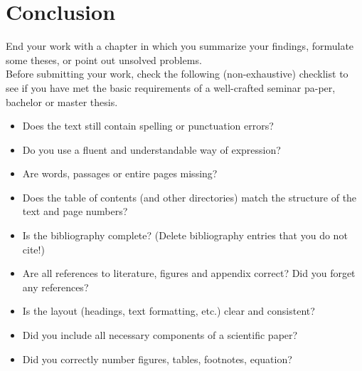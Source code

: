 \section{Conclusion}
End your work with a chapter in which you summarize your findings, formulate some theses, or point out unsolved problems.\\
Before submitting your work, check the following (non-exhaustive) checklist to see if you have met the basic requirements of a well-crafted seminar pa-per, bachelor or master thesis.
\begin{itemize}
	\item Does the text still contain spelling or punctuation errors?
	\item Do you use a fluent and understandable way of expression?
	\item Are words, passages or entire pages missing?
	\item Does the table of contents (and other directories) match the structure of the text and page numbers?
	\item Is the bibliography complete? (Delete bibliography entries that you do not cite!)
	\item Are all references to literature, figures and appendix correct? Did you forget any references?
	\item Is the layout (headings, text formatting, etc.) clear and consistent?
	\item Did you include all necessary components of a scientific paper?
	\item Did you correctly number figures, tables, footnotes, equation?
	
\end{itemize}
\newpage